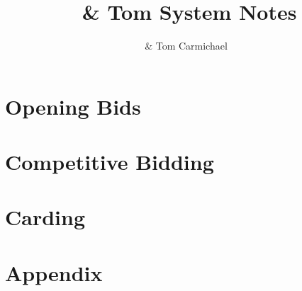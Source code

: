 
\frontmatter



\title{\partner~\& Tom System Notes}
\author{\partnerfull~\& Tom Carmichael}
\maketitle
\tableofcontents

\mainmatter


\part{Opening Bids}













\part{Competitive Bidding}



\part{Carding}

\part{Appendix}

%
\backmatter
